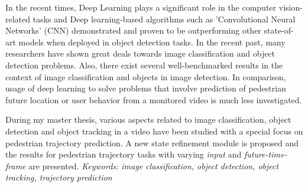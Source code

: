 % 
% 
%


In the recent times, Deep Learning plays a significant role in the computer vision-related tasks and Deep learning-based algorithms such as 'Convolutional Neural Networks'
(CNN) demonstrated and proven to be outperforming other state-of-art models when 
deployed in object detection tasks. In the recent past, many researchers have shown great 
deals towards image classification and object detection problems. Also, there exist several 
well-benchmarked results in the context of image classification and objects in image detection.
In comparison, usage of deep learning to solve problems that involve prediction of pedestrian future location or user behavior from a monitored video is much less investigated.

\vspace{1em}
\noindent During my master thesis, various aspects related to image classification, object 
detection and object tracking in a video have been studied with a special focus on pedestrian trajectory prediction. 
A new state refinement module is proposed and the results for pedestrian trajectory 
tasks with varying \textit{input} and \textit{future-time-frame} are presented.
\baselineskip
\textit{Keywords: image classification, object detection, object tracking, trajectory prediction}
